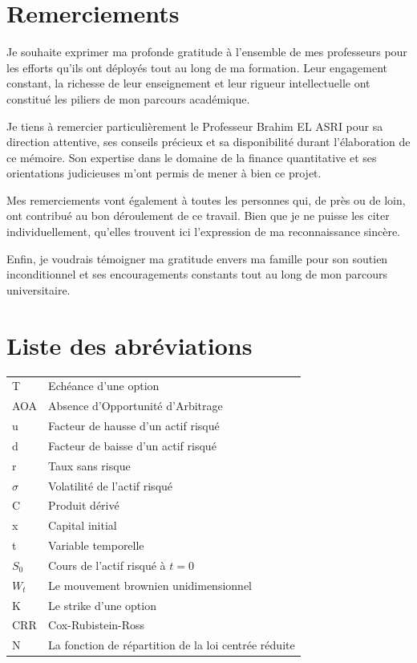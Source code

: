 \documentclass[12pt,a4paper]{report}
\begin{document}
\chapter*{Remerciements}

Je souhaite exprimer ma profonde gratitude à l'ensemble de mes professeurs pour les efforts qu'ils ont déployés tout au long de ma formation. Leur engagement constant, la richesse de leur enseignement et leur rigueur intellectuelle ont constitué les piliers de mon parcours académique.

Je tiens à remercier particulièrement le Professeur Brahim EL ASRI pour sa direction attentive, ses conseils précieux et sa disponibilité durant l'élaboration de ce mémoire. Son expertise dans le domaine de la finance quantitative et ses orientations judicieuses m'ont permis de mener à bien ce projet.

Mes remerciements vont également à toutes les personnes qui, de près ou de loin, ont contribué au bon déroulement de ce travail. Bien que je ne puisse les citer individuellement, qu'elles trouvent ici l'expression de ma reconnaissance sincère.

Enfin, je voudrais témoigner ma gratitude envers ma famille pour son soutien inconditionnel et ses encouragements constants tout au long de mon parcours universitaire.

\clearpage

\listoffigures
\clearpage

\chapter*{Liste des abréviations}

\begin{tabular}{p{} p{}}
T & Echéance d'une option \\
AOA & Absence d'Opportunité d'Arbitrage \\
u & Facteur de hausse d'un actif risqué \\
d & Facteur de baisse d'un actif risqué \\
r & Taux sans risque \\
$\sigma$ & Volatilité de l'actif risqué \\
C & Produit dérivé \\
x & Capital initial \\
t & Variable temporelle \\
$S_0$ & Cours de l'actif risqué à $t=0$ \\
$W_t$ & Le mouvement brownien unidimensionnel \\
K & Le strike d'une option \\
CRR & Cox-Rubistein-Ross \\
N & La fonction de répartition de la loi centrée réduite \\
\end{tabular}
\end{document}
